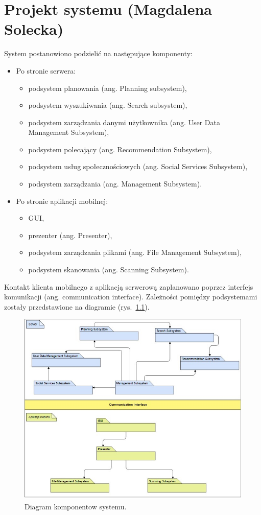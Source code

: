 \documentclass[10pt,twoside,a4paper]{report}
\begin{document}
\chapter{Projekt systemu (Magdalena Solecka)}
\par System postanowiono podzielić na następujące komponenty:
\begin{itemize}
\item Po stronie serwera:
\begin{itemize}
\item podsystem planowania (ang. Planning subsystem),
\item podsystem wyszukiwania (ang. Search subsystem),
\item podsystem zarządzania danymi użytkownika (ang. User Data Management Subsystem),
\item podsystem polecający (ang. Recommendation Subsystem),
\item podsystem usług społecznościowych (ang. Social Services Subsystem),
\item podsystem zarządzania (ang. Management Subsystem).
\end{itemize}
\item Po stronie aplikacji mobilnej:
\begin{itemize}
\item GUI,
\item prezenter (ang. Presenter),
\item podsystem zarządzania plikami (ang. File Management Subsystem),
\item podsystem skanowania (ang. Scanning Subsystem).
\end{itemize}
\end{itemize}
\par Kontakt klienta mobilnego z aplikacją serwerową zaplanowano poprzez interfejs komunikacji (ang. communication interface). Zależności pomiędzy podsystemami zostały przedstawione na diagramie (rys.~\ref{fig:subsystems}).

\indent\newline
\begin{figure}[h]
\centering
\includegraphics[width=\linewidth]{subsystems}
\caption{Diagram komponentow systemu.}
\label{fig:subsystems}
\end{figure}
\end{document}
